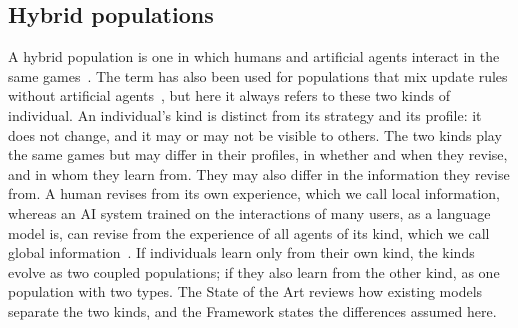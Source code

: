 \subsection{Hybrid populations}

A hybrid population is one in which humans and artificial agents interact in the same games~\cite{hanSocialPhysicsAge2026}. The term has also been used for populations that mix update rules without artificial agents~\cite{fernandesCounterfactualThinkingStochastic2024}, but here it always refers to these two kinds of individual. An individual's kind is distinct from its strategy and its profile: it does not change, and it may or may not be visible to others. The two kinds play the same games but may differ in their profiles, in whether and when they revise, and in whom they learn from. They may also differ in the information they revise from. A human revises from its own experience, which we call local information, whereas an AI system trained on the interactions of many users, as a language model is, can revise from the experience of all agents of its kind, which we call global information~\cite{pedreschiHumanAICoevolution2025}. If individuals learn only from their own kind, the kinds evolve as two coupled populations; if they also learn from the other kind, as one population with two types. The State of the Art reviews how existing models separate the two kinds, and the Framework states the differences assumed here.
